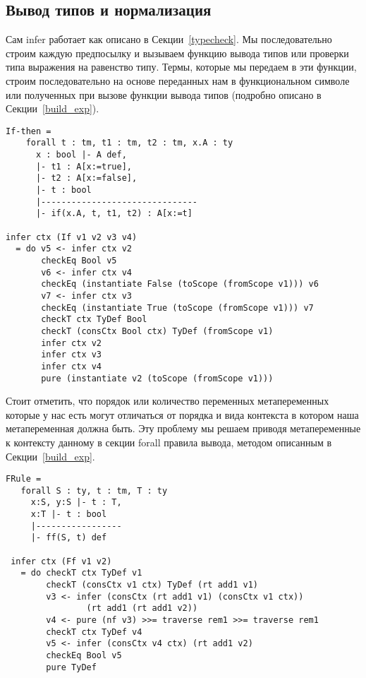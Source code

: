 \subsection{Вывод типов и нормализация}
Сам infer работает как описано в Секции~\ref{typecheck}. Мы последовательно строим каждую предпосылку и вызываем функцию вывода типов или проверки типа выражения на равенство типу. Термы, которые мы передаем в эти функции, строим последовательно на основе переданных нам в функциональном символе или полученных при вызове функции вывода типов (подробно описано в Секции~\ref{build_exp}).

\begin{lstlisting}[caption={Пример правила вывода и части сгенерированной функции infer, соответствующей этому правилу},captionpos=b, frame=single]
If-then =
    forall t : tm, t1 : tm, t2 : tm, x.A : ty
      x : bool |- A def,
      |- t1 : A[x:=true],
      |- t2 : A[x:=false],
      |- t : bool
      |-------------------------------
      |- if(x.A, t, t1, t2) : A[x:=t]

infer ctx (If v1 v2 v3 v4)
  = do v5 <- infer ctx v2
       checkEq Bool v5
       v6 <- infer ctx v4
       checkEq (instantiate False (toScope (fromScope v1))) v6
       v7 <- infer ctx v3
       checkEq (instantiate True (toScope (fromScope v1))) v7
       checkT ctx TyDef Bool
       checkT (consCtx Bool ctx) TyDef (fromScope v1)
       infer ctx v2
       infer ctx v3
       infer ctx v4
       pure (instantiate v2 (toScope (fromScope v1)))
\end{lstlisting}

Стоит отметить, что порядок или количество переменных метапеременных которые у нас есть могут отличаться от порядка и вида контекста в котором наша метапеременная должна быть. Эту проблему мы решаем приводя метапеременные к контексту данному в секции forall правила вывода, методом описанным в Секции~\ref{build_exp}.

\begin{lstlisting}[caption={Искусственный пример случая несоответствия контекстов (контекст t нужно сократить до использования в предпосылке)},captionpos=b, frame=single]
FRule =
   forall S : ty, t : tm, T : ty
     x:S, y:S |- t : T,
     x:T |- t : bool
     |-----------------
     |- ff(S, t) def

 infer ctx (Ff v1 v2)
   = do checkT ctx TyDef v1
        checkT (consCtx v1 ctx) TyDef (rt add1 v1)
        v3 <- infer (consCtx (rt add1 v1) (consCtx v1 ctx))
                (rt add1 (rt add1 v2))
        v4 <- pure (nf v3) >>= traverse rem1 >>= traverse rem1
        checkT ctx TyDef v4
        v5 <- infer (consCtx v4 ctx) (rt add1 v2)
        checkEq Bool v5
        pure TyDef
\end{lstlisting}

